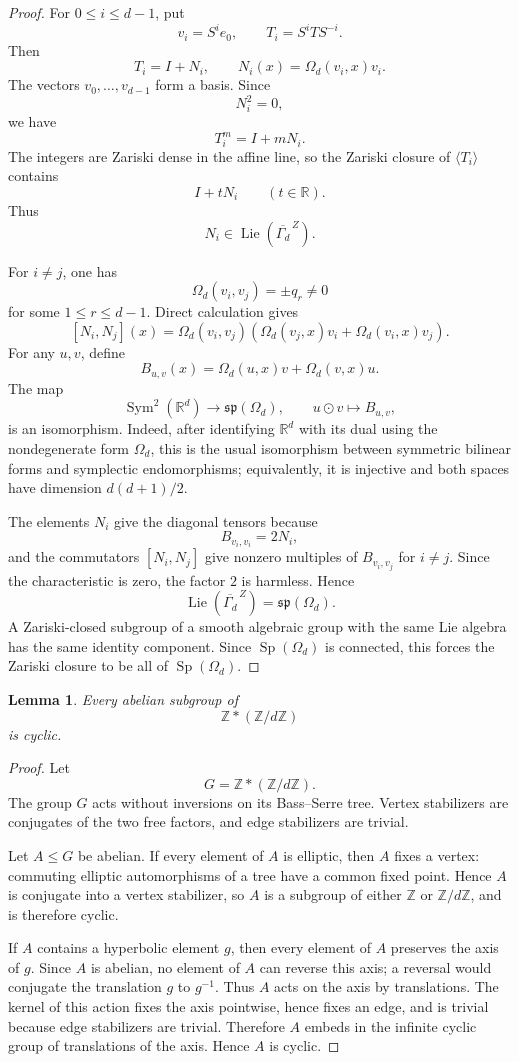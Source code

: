 \documentclass[a4paper,11pt]{amsart}
\newcommand{\Z}{\mathbb Z}
\newcommand{\R}{\mathbb R}
\newcommand{\Sp}{\operatorname{Sp}}
\newcommand{\Sym}{\operatorname{Sym}}
\newcommand{\Lie}{\operatorname{Lie}}
\newtheorem{lemma}[theorem]{Lemma}
\theoremstyle{remark}
\numberwithin{equation}{section}
\begin{document}
\begin{proof}
For \(0\leq i\leq d-1\), put
\[
v_i=S^ie_0,
\qquad
T_i=S^iTS^{-i}.
\]
Then
\[
T_i=I+N_i,
\qquad
N_i(x)=\Omega_d(v_i,x)v_i.
\]
The vectors \(v_0,\ldots,v_{d-1}\) form a basis. Since
\[
N_i^2=0,
\]
we have
\[
T_i^m=I+mN_i.
\]
The integers are Zariski dense in the affine line, so the Zariski closure of \(\langle T_i\rangle\) contains
\[
I+tN_i
\qquad(t\in\R).
\]
Thus
\[
N_i\in\Lie(\overline{\Gamma_d}^{\,Z}).
\]

For \(i\neq j\), one has
\[
\Omega_d(v_i,v_j)=\pm q_r\neq0
\]
for some \(1\leq r\leq d-1\). Direct calculation gives
\[
[N_i,N_j](x)
=
\Omega_d(v_i,v_j)
\left(
\Omega_d(v_j,x)v_i+\Omega_d(v_i,x)v_j
\right).
\]
For any \(u,v\), define
\[
B_{u,v}(x)=\Omega_d(u,x)v+\Omega_d(v,x)u.
\]
The map
\[
\Sym^2(\R^d)\longrightarrow \mathfrak{sp}(\Omega_d),
\qquad
u\odot v\longmapsto B_{u,v},
\]
is an isomorphism. Indeed, after identifying \(\R^d\) with its dual using the nondegenerate form \(\Omega_d\), this is the usual isomorphism between symmetric bilinear forms and symplectic endomorphisms; equivalently, it is injective and both spaces have dimension \(d(d+1)/2\).

The elements \(N_i\) give the diagonal tensors because
\[
B_{v_i,v_i}=2N_i,
\]
and the commutators \([N_i,N_j]\) give nonzero multiples of \(B_{v_i,v_j}\) for \(i\neq j\). Since the characteristic is zero, the factor \(2\) is harmless. Hence
\[
\Lie(\overline{\Gamma_d}^{\,Z})=\mathfrak{sp}(\Omega_d).
\]
A Zariski-closed subgroup of a smooth algebraic group with the same Lie algebra has the same identity component. Since \(\Sp(\Omega_d)\) is connected, this forces the Zariski closure to be all of \(\Sp(\Omega_d)\).
\end{proof}

\begin{lemma}\label{lem:abelian-free-product}
Every abelian subgroup of
\[
\Z*(\Z/d\Z)
\]
is cyclic.
\end{lemma}

\begin{proof}
Let
\[
G=\Z*(\Z/d\Z).
\]
The group \(G\) acts without inversions on its Bass--Serre tree. Vertex stabilizers are conjugates of the two free factors, and edge stabilizers are trivial.

Let \(A\leq G\) be abelian. If every element of \(A\) is elliptic, then \(A\) fixes a vertex: commuting elliptic automorphisms of a tree have a common fixed point. Hence \(A\) is conjugate into a vertex stabilizer, so \(A\) is a subgroup of either \(\Z\) or \(\Z/d\Z\), and is therefore cyclic.

If \(A\) contains a hyperbolic element \(g\), then every element of \(A\) preserves the axis of \(g\). Since \(A\) is abelian, no element of \(A\) can reverse this axis; a reversal would conjugate the translation \(g\) to \(g^{-1}\). Thus \(A\) acts on the axis by translations. The kernel of this action fixes the axis pointwise, hence fixes an edge, and is trivial because edge stabilizers are trivial. Therefore \(A\) embeds in the infinite cyclic group of translations of the axis. Hence \(A\) is cyclic.
\end{proof}
\end{document}
